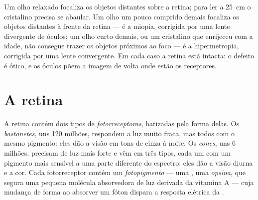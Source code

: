 \begin{example}\label{ex:g11:the-eye:focus}
Um olho relaxado focaliza os objetos distantes sobre a retina; para ler
a \qty{25}{cm} o cristalino precisa se abaular. Um olho um pouco
comprido demais focaliza os objetos distantes à frente da retina --- é
a miopia, corrigida por uma lente divergente de óculos; um olho curto
demais, ou um cristalino que enrijeceu com a idade, não consegue trazer
os objetos próximos ao foco --- é a hipermetropia, corrigida por uma
lente convergente. Em cada caso a retina está intacta: o defeito é
ótico, e os óculos põem a imagem de volta onde estão os receptores.
\end{example}

\section{A retina}

\begin{definition}[Fotorreceptores]\label{def:g11:the-eye:photoreceptors}
A retina contém dois tipos de 
\emph{fotorreceptoras}, batizadas pela forma
delas. Os \emph{bastonetes}, uns 120 milhões,
respondem a luz muito fraca, mas todos com o mesmo pigmento: eles dão a
visão em tons de cinza à noite. Os \emph{cones},
uns 6 milhões, precisam de luz mais forte e vêm em três tipos, cada um
com um pigmento mais sensível a uma parte diferente do espectro: eles
dão a visão diurna e a cor. Cada fotorreceptor contém um
\emph{fotopigmento} --- uma , uma \emph{opsina},
que segura uma pequena molécula absorvedora de luz derivada da vitamina
A --- cuja mudança de forma ao absorver um fóton dispara a resposta
elétrica da .
\end{definition}

